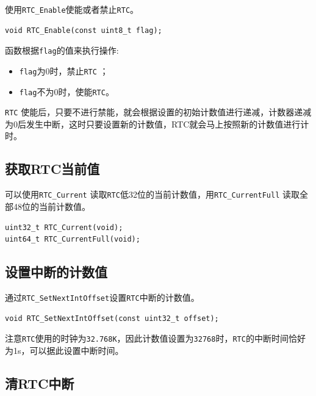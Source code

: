\documentclass[
  12pt,
]{book}
\providecommand{\tightlist}{%
  \setlength{\itemsep}{0pt}\setlength{\parskip}{0pt}}
\begin{document}
使用\texttt{RTC\_Enable}使能或者禁止\texttt{RTC}。

\begin{verbatim}
void RTC_Enable(const uint8_t flag);
\end{verbatim}

函数根据\texttt{flag}的值来执行操作:

\begin{itemize}
\tightlist
\item
  \texttt{flag}为0时，禁止\texttt{RTC} ；
\item
  \texttt{flag}不为0时，使能\texttt{RTC}。
\end{itemize}

\texttt{RTC} 使能后，只要不进行禁能，就会根据设置的初始计数值进行递减，计数器递减为0后发生中断，这时只要设置新的计数值，RTC就会马上按照新的计数值进行计时。

\hypertarget{ux83b7ux53d6rtcux5f53ux524dux503c}{%
\subsection{获取RTC当前值}\label{ux83b7ux53d6rtcux5f53ux524dux503c}}

可以使用\texttt{RTC\_Current} 读取\texttt{RTC}低32位的当前计数值，用\texttt{RTC\_CurrentFull} 读取全部48位的当前计数值。

\begin{verbatim}
uint32_t RTC_Current(void);
uint64_t RTC_CurrentFull(void);
\end{verbatim}

\hypertarget{ux8bbeux7f6eux4e2dux65adux7684ux8ba1ux6570ux503c}{%
\subsection{设置中断的计数值}\label{ux8bbeux7f6eux4e2dux65adux7684ux8ba1ux6570ux503c}}

通过\texttt{RTC\_SetNextIntOffset}设置\texttt{RTC}中断的计数值。

\begin{verbatim}
void RTC_SetNextIntOffset(const uint32_t offset);
\end{verbatim}

注意\texttt{RTC}使用的时钟为\texttt{32.768K}，因此计数值设置为\texttt{32768}时，\texttt{RTC}的中断时间恰好为1s，可以据此设置中断时间。

\hypertarget{ux6e05rtcux4e2dux65ad}{%
\subsection{清RTC中断}\label{ux6e05rtcux4e2dux65ad}}
\end{document}
